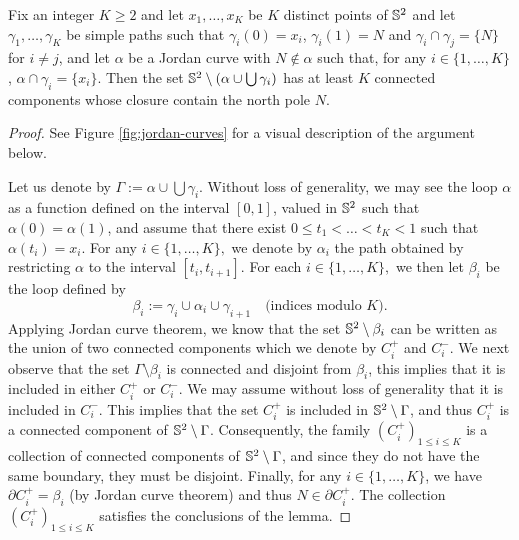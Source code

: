 \documentclass[12pt]{amsart}
\numberwithin{equation}{section}
\begin{document}
	
	\begin{lemma} \label{lemma:jordan-curves-theorem}
		Fix an integer $K \geq 2$ and let $x_1, \ldots, x_K$ be $K$ distinct points of $\S^2$ and let $\gamma_1 , \ldots, \gamma_K$ be simple paths such that $\gamma_i(0) = x_i$, $\gamma_i(1) = N$ and $\gamma_i \cap \gamma_j = \{ N \}$ for $i \neq j$, and let $\alpha$ be a Jordan curve with $N \notin \alpha$ such that, for any $i \in \{1 , \ldots, K\}$, $\alpha \cap \gamma_i = \{ x_i \}.$
		Then the set $\S^2 \setminus \left( \alpha \cup \bigcup \gamma_i\right)$ has at least $K$ connected components whose closure contain the north pole $N$.
	\end{lemma}
	
	\begin{proof}
		See Figure \ref{fig:jordan-curves} for a visual description of the argument below. 
		
		Let us denote by $\Gamma := \alpha \cup \bigcup \gamma_i  $. Without loss of generality, we may see the loop $\alpha$ as a function defined on the interval $[0 , 1]$, valued in $\S^2$ such that $\alpha(0) = \alpha(1)$, and assume that there exist $ 0 \leq t_1 < \ldots < t_K < 1$ such that $\alpha(t_i) = x_i$. For any $i \in \{ 1 , \ldots, K \},$ we denote by $\alpha_i$ the path obtained by restricting $\alpha$ to the interval $[t_i , t_{i+1}].$ For each $i \in \{ 1 , \ldots, K\},$ we then let $\beta_i$ be the loop defined by
		\begin{equation} \label{eq:concatenated-curve}
			\beta_i := \gamma_{i} \cup \alpha_i \cup  \gamma_{i+1} \quad \mbox{(indices modulo $K$)}.
		\end{equation}
		Applying Jordan curve theorem, we know that the set $\S^2 \setminus \beta_i$ can be written as the union of two connected components which we denote by $C_{i}^+$ and $C_{i}^-$. We next observe that the set $\Gamma \setminus \beta_i$ is connected and disjoint from $\beta_i$, this implies that it is included in either $C_{i}^+$ or $C_{i}^-$. We may assume without loss of generality that it is included in $C_{i}^-$. This implies that the set $C_{i}^+$ is included in $\S^2 \setminus \Gamma$, and thus $C_{i}^+$ is a connected component of $\S^2 \setminus \Gamma$. Consequently, the family $(C_{i}^+)_{1 \leq i \leq K}$ is a collection of connected components of $\S^2 \setminus \Gamma$, and since they do not have the same boundary, they must be disjoint. Finally, for any $i \in \{ 1 , \ldots, K\}$, we have $\partial C_{i}^+ = \beta_i$ (by Jordan curve theorem) and thus $N \in \partial C_{i}^+$. The collection $(C_{i}^+)_{1 \leq i \leq K}$ satisfies the conclusions of the lemma.
	\end{proof}
	
\end{document}
